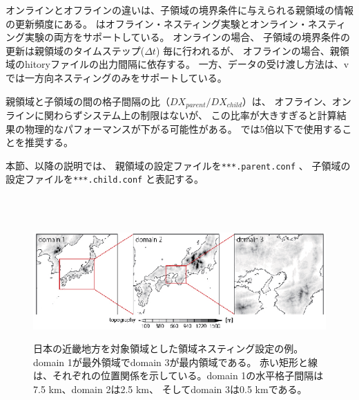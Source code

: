 オンラインとオフラインの違いは、子領域の境界条件に与えられる親領域の情報の更新頻度にある。
\scalerm はオフライン・ネスティング実験とオンライン・ネスティング実験の両方をサポートしている。
オンラインの場合、
子領域の境界条件の更新は親領域のタイムステップ($\Delta t$) 毎に行われるが、
オフラインの場合、親領域のhitoryファイルの出力間隔に依存する。
一方、データの受け渡し方法は、\scalerm v{\version} では一方向ネスティングのみをサポートしている。

親領域と子領域の間の格子間隔の比（$DX_{parent}/DX_{child}$）は、
オフライン、オンラインに関わらずシステム上の制限はないが、
この比率が大きすぎると計算結果の物理的なパフォーマンスが下がる可能性がある。
\scalerm では5倍以下で使用することを推奨する。

本節、以降の説明では、
親領域の設定ファイルを\verb|***.parent.conf| 、
子領域の設定ファイルを\verb|***.child.conf| と表記する。

~~\\
~~\\

\begin{figure}[t]
\begin{center}
  \includegraphics[width=1.0\hsize]{./figure/nesting_sample.eps}\\
  \caption{日本の近畿地方を対象領域とした領域ネスティング設定の例。 
    domain 1が最外領域でdomain 3が最内領域である。
    赤い矩形と線は、それぞれの位置関係を示している。domain 1の水平格子間隔は7.5 km、domain 2は2.5 km、
    そしてdomain 3は0.5 kmである。}
  \label{fig_nestsample}
\end{center}
\end{figure}


\\


